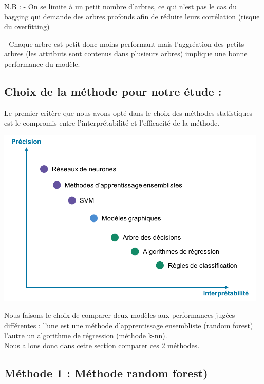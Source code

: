 \documentclass[11pt]{article}
\begin{document}
N.B : 
- On se limite à un petit nombre d'arbres, ce qui n'est pas le cas du bagging qui demande des arbres profonds afin de réduire leurs corrélation (risque du overfitting)

- Chaque arbre est petit donc moins performant mais l'aggréation des petits arbres (les attributs sont contenus dans plusieurs arbres) implique une bonne performance du modèle.


\subsection{Choix de la méthode pour notre étude : }

Le premier critère que nous avons opté dans le choix des méthodes statistiques est le compromis entre l'interprétabilité et l'efficacité de la méthode.

\begin{center}
       \includegraphics[width=13cm]{./figures/acc_vs_int.png}
\end{center}

Nous faisons le choix de comparer deux modèles aux performances jugées différentes : l'une est une méthode d'apprentissage ensembliste (random forest) l'autre un algorithme de régression (méthode k-nn).\\


Nous allons donc dans cette section comparer ces 2 méthodes.


\subsection{Méthode 1 : Méthode random forest)}
\end{document}
